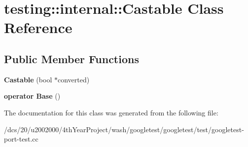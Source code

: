 \hypertarget{classtesting_1_1internal_1_1Castable}{}\section{testing\+:\+:internal\+:\+:Castable Class Reference}
\label{classtesting_1_1internal_1_1Castable}
\subsection*{Public Member Functions}
\begin{DoxyCompactItemize}
\item 
\mbox{\label{classtesting_1_1internal_1_1Castable_a705d519a227d38ff5c174905316f62c4}} 
{\bfseries Castable} (bool $\ast$converted)
\item 
\mbox{\label{classtesting_1_1internal_1_1Castable_ac60b2e7885f3b09defb829eddaa0afd9}} 
{\bfseries operator Base} ()
\end{DoxyCompactItemize}


The documentation for this class was generated from the following file\+:\begin{DoxyCompactItemize}
\item 
/dcs/20/u2002000/4th\+Year\+Project/wash/googletest/googletest/test/googletest-\/port-\/test.\+cc\end{DoxyCompactItemize}
